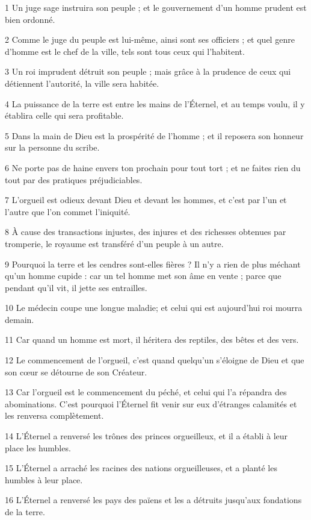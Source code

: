 
\par 1 Un juge sage instruira son peuple ; et le gouvernement d'un homme prudent est bien ordonné.
\par 2 Comme le juge du peuple est lui-même, ainsi sont ses officiers ; et quel genre d'homme est le chef de la ville, tels sont tous ceux qui l'habitent.
\par 3 Un roi imprudent détruit son peuple ; mais grâce à la prudence de ceux qui détiennent l'autorité, la ville sera habitée.
\par 4 La puissance de la terre est entre les mains de l'Éternel, et au temps voulu, il y établira celle qui sera profitable.
\par 5 Dans la main de Dieu est la prospérité de l'homme ; et il reposera son honneur sur la personne du scribe.
\par 6 Ne porte pas de haine envers ton prochain pour tout tort ; et ne faites rien du tout par des pratiques préjudiciables.
\par 7 L'orgueil est odieux devant Dieu et devant les hommes, et c'est par l'un et l'autre que l'on commet l'iniquité.
\par 8 À cause des transactions injustes, des injures et des richesses obtenues par tromperie, le royaume est transféré d'un peuple à un autre.
\par 9 Pourquoi la terre et les cendres sont-elles fières ? Il n’y a rien de plus méchant qu’un homme cupide : car un tel homme met son âme en vente ; parce que pendant qu'il vit, il jette ses entrailles.
\par 10 Le médecin coupe une longue maladie; et celui qui est aujourd'hui roi mourra demain.
\par 11 Car quand un homme est mort, il héritera des reptiles, des bêtes et des vers.
\par 12 Le commencement de l'orgueil, c'est quand quelqu'un s'éloigne de Dieu et que son cœur se détourne de son Créateur.
\par 13 Car l'orgueil est le commencement du péché, et celui qui l'a répandra des abominations. C'est pourquoi l'Éternel fit venir sur eux d'étranges calamités et les renversa complètement.
\par 14 L'Éternel a renversé les trônes des princes orgueilleux, et il a établi à leur place les humbles.
\par 15 L'Éternel a arraché les racines des nations orgueilleuses, et a planté les humbles à leur place.
\par 16 L'Éternel a renversé les pays des païens et les a détruits jusqu'aux fondations de la terre.
